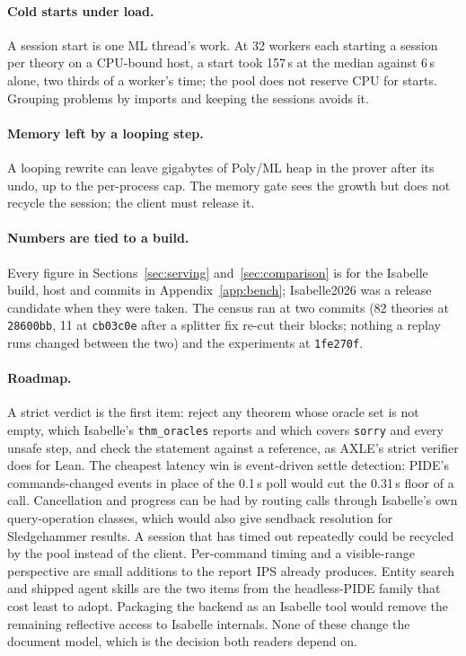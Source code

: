 \documentclass[11pt]{article}
\newcommand{\code}[1]{\colorbox{gray!12}{\texttt{\vphantom{Ag}#1}}}
\begin{document}
\paragraph{Cold starts under load.} A session start is one ML thread's
work. At 32 workers each starting a session per theory on a CPU-bound
host, a start took 157\,s at the median against 6\,s alone, two thirds
of a worker's time; the pool does not reserve CPU for starts. Grouping
problems by imports and keeping the sessions avoids it.

\paragraph{Memory left by a looping step.} A looping rewrite can leave
gigabytes of Poly/ML heap in the prover after its undo, up to the
per-process cap. The memory gate sees the growth but does not recycle
the session; the client must release it.

\paragraph{Numbers are tied to a build.} Every figure in
Sections~\ref{sec:serving} and~\ref{sec:comparison} is for the Isabelle
build, host and commits in Appendix~\ref{app:bench}; Isabelle2026 was a
release candidate when they were taken. The census ran at two commits
(82 theories at \code{28600bb}, 11 at \code{cb03c0e} after a splitter
fix re-cut their blocks; nothing a replay runs changed between the two)
and the experiments at \code{1fe270f}.

\paragraph{Roadmap.} A strict verdict is the first item: reject any
theorem whose oracle set is not empty, which Isabelle's
\code{thm\_oracles} reports and which covers \code{sorry} and every
unsafe step, and check the statement against a reference, as AXLE's
strict verifier does for Lean. The cheapest latency win is event-driven
settle detection: PIDE's commands-changed events in place of the 0.1\,s
poll would cut the 0.31\,s floor of a call. Cancellation and progress
can be had by routing calls through Isabelle's own query-operation
classes, which would also give sendback resolution for Sledgehammer
results. A session that has timed out repeatedly could be recycled by
the pool instead of the client. Per-command timing and
a visible-range perspective are small additions to the report IPS already
produces. Entity search and shipped agent skills are the two items from
the headless-PIDE family that cost least to adopt. Packaging the backend
as an Isabelle tool would remove the remaining reflective access to
Isabelle internals. None of these change the document model, which is
the decision both readers depend on.
\end{document}
